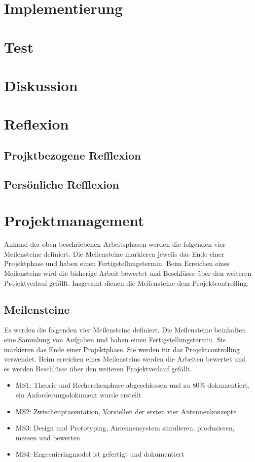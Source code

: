 \newpage
\section{Implementierung}
\section{Test}
\section{Diskussion}
\section{Reflexion}
\subsection{Projktbezogene Refflexion}
\subsection{Persönliche Refflexion}
\section{Projektmanagement}
Anhand der oben beschriebenen Arbeitsphasen werden die folgenden vier Meilensteine definiert. Die Meilensteine markieren jeweils das Ende einer Projektphase und haben einen Fertigstellungstermin. Beim Erreichen eines Meilensteins wird die bisherige Arbeit bewertet und Beschlüsse über den weiteren Projektverlauf gefällt. Insgesamt dienen die Meilensteine dem Projektcontrolling.
\subsection{Meilensteine}
Es werden die folgenden vier Meilensteine definiert. Die Meilensteine
beinhalten   eine Sammlung von Aufgaben und haben einen
Fertigstellungstermin. Sie markieren das Ende einer Projektphase. Sie
werden für das Projektcontrolling verwendet. Beim erreichen eines Meilensteins werden die Arbeiten bewertet und es werden Beschlüsse über den weiteren Projektverlauf gefällt.
	\begin{itemize}
		\item MS1: Theorie und Recherchenphase abgeschlossen und zu 80\% dokumentiert, ein Anforderungsdokument wurde erstellt
		\item MS2: Zwischenpräsentation, Vorstellen der ersten vier Antennenkonzepte
		\item MS3: Design und Prototyping, Antennensystem simulieren, produzieren, messen und bewerten
		\item MS4: Engeenieringmodel ist gefertigt und dokumentiert
	\end{itemize}

